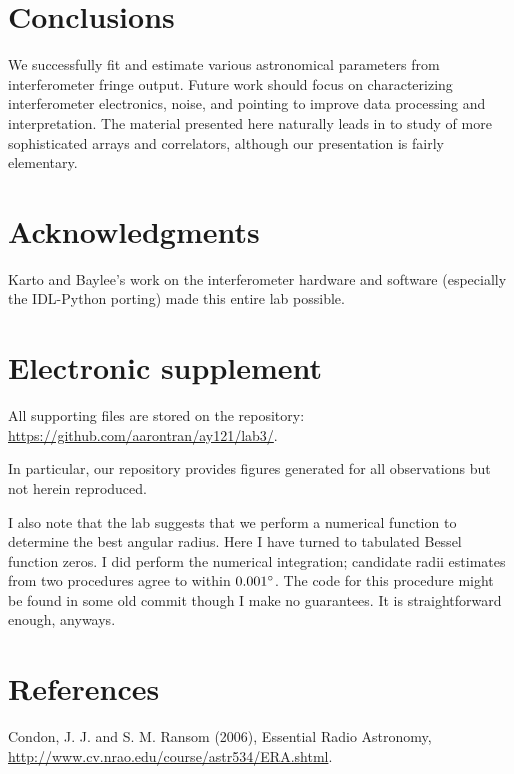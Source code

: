 \documentclass[10pt]{article}
\begin{document}
\section{Conclusions}

We successfully fit and estimate various astronomical parameters from interferometer fringe output.  Future work should focus on characterizing interferometer electronics, noise, and pointing to improve data processing and interpretation.  The material presented here naturally leads in to study of more sophisticated arrays and correlators, although our presentation is fairly elementary.

\section{Acknowledgments}

Karto and Baylee's work on the interferometer hardware and software (especially the IDL-Python porting) made this entire lab possible.

\section{Electronic supplement}

All supporting files are stored on the repository:\\
\href{https://github.com/aarontran/ay121}
{https://github.com/aarontran/ay121/lab3/}.

In particular, our repository provides figures generated for all observations but not herein reproduced.

I also note that the lab suggests that we perform a numerical function to determine the best angular radius.  Here I have turned to tabulated Bessel function zeros.  I did perform the numerical integration; candidate radii estimates from two procedures agree to within $0.001\degree$.  The code for this procedure might be found in some old commit though I make no guarantees.  It is straightforward enough, anyways.

\section{References}

\hangindent 0.25in Condon, J. J. and S. M. Ransom (2006), Essential Radio Astronomy, \\
\href{http://www.cv.nrao.edu/course/astr534/ERA.shtml}
{http://www.cv.nrao.edu/course/astr534/ERA.shtml}.
\end{document}
